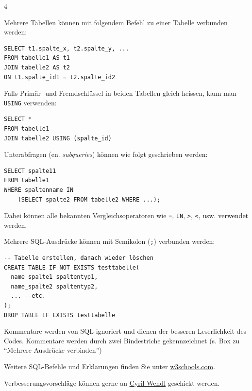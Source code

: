 \begin{landscape}
\begin{multicols*}{4}
\begin{cheatSheetBox}[title=Mehrere Tabellen verbinden: \texorpdfstring{\lstinline|JOIN|}{JOIN}]
Mehrere Tabellen können mit folgendem Befehl zu einer Tabelle verbunden werden:

\begin{lstlisting}
SELECT t1.spalte_x, t2.spalte_y, ...
FROM tabelle1 AS t1
JOIN tabelle2 AS t2
ON t1.spalte_id1 = t2.spalte_id2
\end{lstlisting}

Falls Primär- und Fremdschlüssel in beiden Tabellen gleich heissen, kann man \lstinline|USING| verwenden:
\begin{lstlisting}
SELECT *
FROM tabelle1 
JOIN tabelle2 USING (spalte_id)
\end{lstlisting}
\end{cheatSheetBox}

\begin{cheatSheetBox}[title=Unterabfragen (Subqueries)]
Unterabfragen (en. \textit{subqueries}) können wie folgt geschrieben werden:
\begin{lstlisting}
SELECT spalte11 
FROM tabelle1
WHERE spaltenname IN
    (SELECT spalte2 FROM tabelle2 WHERE ...);
\end{lstlisting}
Dabei können alle bekannten Vergleichsoperatoren wie \lstinline|=|, \lstinline|IN|, \lstinline|>|, \lstinline|<|, usw. verwendet werden.
\end{cheatSheetBox}

\begin{cheatSheetBox}[title=Mehrere Ausdrücke verbinden]
Mehrere SQL-Ausdrücke können mit Semikolon (\texttt{;}) verbunden werden:
\begin{lstlisting}
-- Tabelle erstellen, danach wieder löschen
CREATE TABLE IF NOT EXISTS testtabelle(
  name_spalte1 spaltentyp1,
  name_spalte2 spaltentyp2,
  ... --etc.
);
DROP TABLE IF EXISTS testtabelle
\end{lstlisting}
\end{cheatSheetBox}

\begin{cheatSheetBox}[title=Kommentare]
Kommentare werden von SQL ignoriert und dienen der besseren Leserlichkeit des Codes. Kommentare werden durch zwei Bindestriche gekennzeichnet (s. Box zu \enquote{Mehrere Ausdrücke verbinden})
\end{cheatSheetBox}

\begin{cheatSheetBox}[title=Weitere Befehle \& Feedback]
Weitere \acrshort{SQL}-Befehle und Erklärungen finden Sie unter \href{https://www.w3schools.com/sql/default.asp}{w3schools.com}.

Verbesserungsvorschläge können gerne an \href{mailto:cyril.wendl@edu.zh.ch}{Cyril Wendl} geschickt werden.
\end{cheatSheetBox}

\end{multicols*}

\end{landscape}

